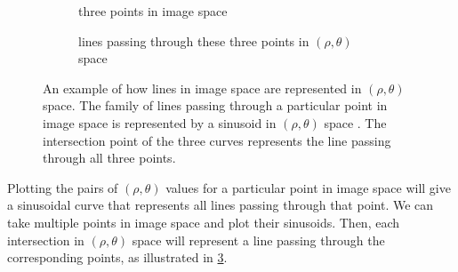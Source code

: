\documentclass[../main.tex]{subfiles}
\begin{document}
\begin{figure}
    \centering
    \begin{subfigure}[t]{0.4\textwidth}
        \caption{three points in image space}
        \label{fig:hough_points_image_space}
    \end{subfigure}
    \hfill
    \begin{subfigure}[t]{0.56\textwidth}
        \caption{lines passing through these three points in $(\rho,\theta)$ space}
        \label{fig:hough_points_parameter_space}
    \end{subfigure}
    \caption[An example of how lines in image space are represented in $(\rho,\theta)$ space.]{An example of how lines in image space are represented in $(\rho,\theta)$ space. The family of lines passing through a particular point in image space  is represented by a sinusoid in $(\rho,\theta)$ space . The intersection point of the three curves represents the line passing through all three points.}
    \label{fig:hough_points}
\end{figure}
Plotting the pairs of $(\rho, \theta)$ values for a particular point in image space will give a sinusoidal curve that represents all lines passing through that point.
We can take multiple points in image space and plot their sinusoids. 
Then, each intersection in $(\rho, \theta)$ space will represent a line passing through the corresponding points, as illustrated in \cref{fig:hough_points}.
\end{document}
